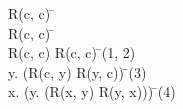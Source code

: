 \documentclass{article}
\begin{document}
\begin{proofbox}
\open
\: R(c, c) \= \asm \\
\: R(c, c) \=  \\
\close
\: R(c, c) \rightarrow R(c, c) \= \impliesintro(1, 2) \\
\: \exists y. (R(c, y) \rightarrow R(y, c)) \= \existsintro(3) \\
\: \exists x. (\exists y. (R(x, y) \rightarrow R(y, x))) \= \existsintro(4) \\
\end{proofbox}
\end{document}
